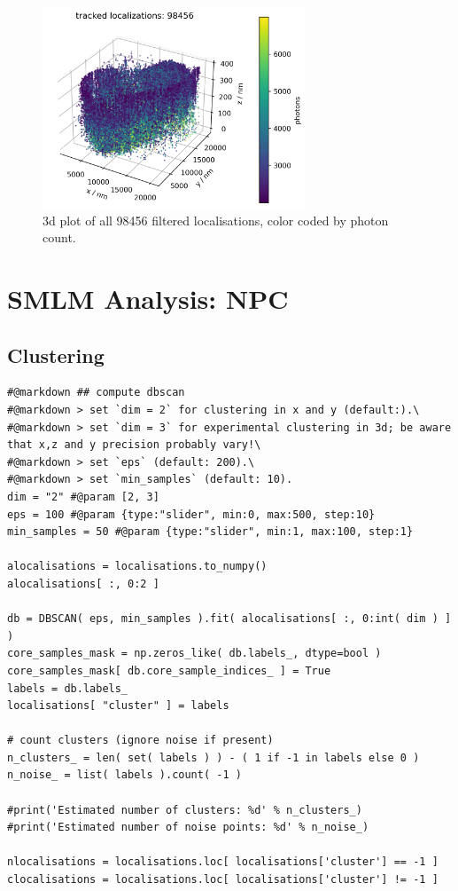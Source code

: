 \documentclass[11pt, a4paper, oneside, twocolumn]{report}
\begin{document}
\begin{figure}[h!]
  \centering
  \includegraphics[width=0.7\textwidth]{5_tracking.png}
  \caption{3d plot of all 98456 filtered localisations, color coded by
    photon count.}
  \label{f:5_tracking}
\end{figure}


\section{SMLM Analysis: NPC}

\subsection{Clustering}

\begin{verbatim}
#@markdown ## compute dbscan
#@markdown > set `dim = 2` for clustering in x and y (default:).\
#@markdown > set `dim = 3` for experimental clustering in 3d; be aware that x,z and y precision probably vary!\
#@markdown > set `eps` (default: 200).\
#@markdown > set `min_samples` (default: 10).
dim = "2" #@param [2, 3]
eps = 100 #@param {type:"slider", min:0, max:500, step:10}
min_samples = 50 #@param {type:"slider", min:1, max:100, step:1}

alocalisations = localisations.to_numpy()
alocalisations[ :, 0:2 ]

db = DBSCAN( eps, min_samples ).fit( alocalisations[ :, 0:int( dim ) ] )
core_samples_mask = np.zeros_like( db.labels_, dtype=bool )
core_samples_mask[ db.core_sample_indices_ ] = True
labels = db.labels_
localisations[ "cluster" ] = labels

# count clusters (ignore noise if present)
n_clusters_ = len( set( labels ) ) - ( 1 if -1 in labels else 0 )
n_noise_ = list( labels ).count( -1 )

#print('Estimated number of clusters: %d' % n_clusters_)
#print('Estimated number of noise points: %d' % n_noise_)

nlocalisations = localisations.loc[ localisations['cluster'] == -1 ]
clocalisations = localisations.loc[ localisations['cluster'] != -1 ]
\end{verbatim}
           
\end{document}
